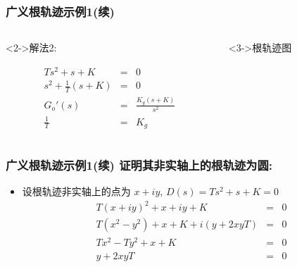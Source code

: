 \documentclass{beamer}
\begin{document}
\begin{frame}
\frametitle{广义根轨迹示例1(续)}
\label{sec-1-3}
\begin{columns}
\begin{column}{0.5\textwidth}
\begin{block}<2->{解法2:}
\label{sec-1-3-1}

\begin{eqnarray*}
Ts^2+s+K &=& 0 \\
s^2+\frac{1}{T}(s+K) &=& 0\\
G_o'(s) &=&\frac{K_g(s+K)}{s^2} \\
\frac{1}{T} &=& K_g
\end{eqnarray*}
\end{block}
\end{column}
\begin{column}{0.5\textwidth}
\begin{block}<3->{根轨迹图}
\label{sec-1-3-2}

\end{block}
\end{column}
\end{columns}
\end{frame}
\begin{frame}
\frametitle{广义根轨迹示例1(续) 证明其非实轴上的根轨迹为圆:}
\label{sec-1-4}

\begin{itemize}
\item 设根轨迹非实轴上的点为 $x+iy$, $D(s) = Ts^2+s+K=0$
       \begin{eqnarray*}
       T(x+iy)^2+x+iy+K &=& 0 \\
       T(x^2-y^2)+x+K+i(y+2xyT) &=& 0 \\
       Tx^2-Ty^2+x+K &=& 0 \\
       y+2xyT &=& 0 \\
       \end{eqnarray*}
\end{itemize}
\end{frame}
\end{document}
